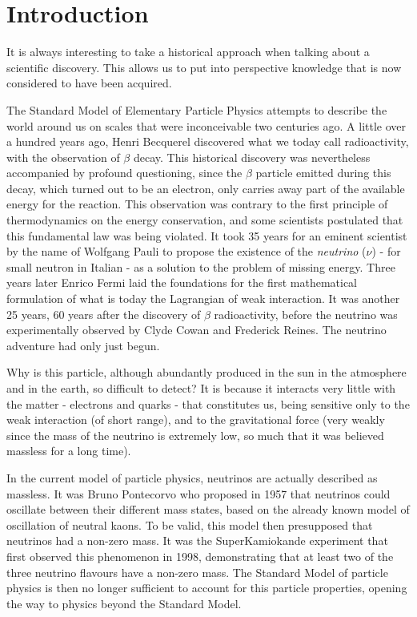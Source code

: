 \chapter*{Introduction}
\label{ch:intro}

It is always interesting to take a historical approach when talking about a scientific discovery. This allows us to put into perspective knowledge that is now considered to have been acquired.

The Standard Model of Elementary Particle Physics attempts to describe the world around us on scales that were inconceivable two centuries ago.
A little over a hundred years ago, Henri Becquerel discovered what we today call radioactivity, with the observation of $\beta$ decay.
This historical discovery was nevertheless accompanied by profound questioning, since the $\beta$ particle emitted during this decay, which turned out to be an electron, only carries away part of the available energy for the reaction.
This observation was contrary to the first principle of thermodynamics on the energy conservation, and some scientists postulated that this fundamental law was being violated.
It took 35 years for an eminent scientist by the name of Wolfgang Pauli to propose the existence of the \emph{neutrino} ($\nu$) - for small neutron in Italian - as a solution to the problem of missing energy.
Three years later Enrico Fermi laid the foundations for the first mathematical formulation of what is today the Lagrangian of weak interaction.
It was another 25 years, 60 years after the discovery of $\beta$ radioactivity, before the neutrino was experimentally observed by Clyde Cowan and Frederick Reines.
The neutrino adventure had only just begun.

Why is this particle, although abundantly produced in the sun in the atmosphere and in the earth, so difficult to detect?
It is because it interacts very little with the matter - electrons and quarks - that constitutes us, being sensitive only to the weak interaction (of short range), and to the gravitational force (very weakly since the mass of the neutrino is extremely low, so much that it was believed massless for a long time).

In the current model of particle physics, neutrinos are actually described as massless.
It was Bruno Pontecorvo who proposed in 1957 that neutrinos could oscillate between their different mass states, based on the already known model of oscillation of neutral kaons.
To be valid, this model then presupposed that neutrinos had a non-zero mass.
It was the SuperKamiokande experiment that first observed this phenomenon in 1998, demonstrating that at least two of the three neutrino flavours have a non-zero mass.
The Standard Model of particle physics is then no longer sufficient to account for this particle properties, opening the way to physics beyond the Standard Model.

